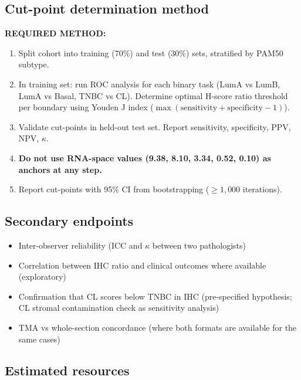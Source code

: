 \documentclass[11pt, a4paper]{article}
\begin{document}
\subsection{Cut-point determination method}

\begin{mdframed}[backgroundcolor=protocolbox,
                 linecolor=green!50!black,
                 linewidth=1pt]
\textbf{REQUIRED METHOD:}
\begin{enumerate}
    \item Split cohort into training (70\%)
    and test (30\%) sets, stratified by
    PAM50 subtype.
    \item In training set: run ROC analysis
    for each binary task (LumA vs LumB,
    LumA vs Basal, TNBC vs CL). Determine
    optimal H-score ratio threshold per
    boundary using Youden J index
    ($\max(\text{sensitivity} +
    \text{specificity} - 1)$).
    \item Validate cut-points in held-out
    test set. Report sensitivity, specificity,
    PPV, NPV, $\kappa$.
    \item \textbf{Do not use RNA-space values
    (9.38, 8.10, 3.34, 0.52, 0.10) as anchors
    at any step.}
    \item Report cut-points with 95\% CI
    from bootstrapping ($\geq 1{,}000$
    iterations).
\end{enumerate}
\end{mdframed}

\subsection{Secondary endpoints}

\begin{itemize}[noitemsep]
    \item Inter-observer reliability (ICC
    and $\kappa$ between two pathologists)
    \item Correlation between IHC ratio and
    clinical outcomes where available
    (exploratory)
    \item Confirmation that CL scores below
    TNBC in IHC (pre-specified hypothesis;
    CL stromal contamination check as
    sensitivity analysis)
    \item TMA vs whole-section concordance
    (where both formats are available for
    the same cases)
\end{itemize}

\subsection{Estimated resources}
\end{document}
